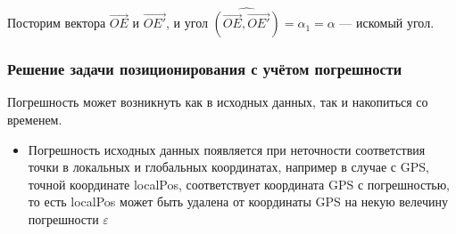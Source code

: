 \documentclass[a4paper, 11pt, titlepage]{article}
\begin{document}
          Посторим вектора $\vec{OE}$ и $\vec{OE'}$, и угол $\widehat{(\vec{OE}, \vec{OE'})} = \alpha_1 = \alpha$ --- искомый угол.

            
        \subsubsection{Решение задачи позиционирования с учётом погрешности}
          Погрешность может возникнуть как в исходных данных, так и накопиться со временем.
          \begin{itemize}
             \item Погрешность исходных данных появляется при неточности соответствия точки в локальных и глобальных координатах,
             например в случае с GPS, точной координате localPos, соответствует координата GPS с погрешностью, то есть localPos
             может быть удалена от координаты GPS на некую велечину погрешности $\varepsilon$ 
             \begin{figure}[H]
              \centering
\end{figure}
\end{itemize}
\end{document}
